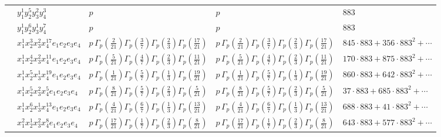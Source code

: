 \documentclass[11pt]{article}
\begin{document}
\begin{table}[ht]
{\begin{tabular}{@{}lllll@{}}
 & $y_{1}^{1} y_{2}^{5} y_{3}^{2} y_{4}^{3}$ & $p \,$ & $p \,$ & $883$ \\
 & $y_{1}^{1} y_{2}^{6} y_{3}^{1} y_{4}^{7}$ & $p \,$ & $p \,$ & $883$ \\
 & $x_{1}^{1} x_{2}^{3} x_{3}^{2} x_{4}^{17}  e_{1} e_{2} e_{3} e_{4}$ & $p \, \Gamma_p \left( \frac{2}{21} \right) \Gamma_p \left( \frac{3}{7} \right) \Gamma_p \left( \frac{2}{3} \right) \Gamma_p \left( \frac{17}{21} \right)$ & $p \, \Gamma_p \left( \frac{2}{21} \right) \Gamma_p \left( \frac{3}{7} \right) \Gamma_p \left( \frac{2}{3} \right) \Gamma_p \left( \frac{17}{21} \right)$ & $845{\cdot}883{+}356{\cdot}883^{2}{+}\cdots$ \\
 & $x_{1}^{1} x_{2}^{4} x_{3}^{2} x_{4}^{11}  e_{1} e_{2} e_{3} e_{4}$ & $p \, \Gamma_p \left( \frac{5}{21} \right) \Gamma_p \left( \frac{4}{7} \right) \Gamma_p \left( \frac{2}{3} \right) \Gamma_p \left( \frac{11}{21} \right)$ & $p \, \Gamma_p \left( \frac{5}{21} \right) \Gamma_p \left( \frac{4}{7} \right) \Gamma_p \left( \frac{2}{3} \right) \Gamma_p \left( \frac{11}{21} \right)$ & $170{\cdot}883{+}875{\cdot}883^{2}{+}\cdots$ \\
 & $x_{1}^{1} x_{2}^{5} x_{3}^{1} x_{4}^{19}  e_{1} e_{2} e_{3} e_{4}$ & $p \, \Gamma_p \left( \frac{1}{21} \right) \Gamma_p \left( \frac{5}{7} \right) \Gamma_p \left( \frac{1}{3} \right) \Gamma_p \left( \frac{19}{21} \right)$ & $p \, \Gamma_p \left( \frac{1}{21} \right) \Gamma_p \left( \frac{5}{7} \right) \Gamma_p \left( \frac{1}{3} \right) \Gamma_p \left( \frac{19}{21} \right)$ & $860{\cdot}883{+}642{\cdot}883^{2}{+}\cdots$ \\
 & $x_{1}^{1} x_{2}^{5} x_{3}^{2} x_{4}^{5}  e_{1} e_{2} e_{3} e_{4}$ & $p \, \Gamma_p \left( \frac{8}{21} \right) \Gamma_p \left( \frac{5}{7} \right) \Gamma_p \left( \frac{2}{3} \right) \Gamma_p \left( \frac{5}{21} \right)$ & $p \, \Gamma_p \left( \frac{8}{21} \right) \Gamma_p \left( \frac{5}{7} \right) \Gamma_p \left( \frac{2}{3} \right) \Gamma_p \left( \frac{5}{21} \right)$ & $37{\cdot}883{+}685{\cdot}883^{2}{+}\cdots$ \\
 & $x_{1}^{1} x_{2}^{6} x_{3}^{1} x_{4}^{13}  e_{1} e_{2} e_{3} e_{4}$ & $p \, \Gamma_p \left( \frac{4}{21} \right) \Gamma_p \left( \frac{6}{7} \right) \Gamma_p \left( \frac{1}{3} \right) \Gamma_p \left( \frac{13}{21} \right)$ & $p \, \Gamma_p \left( \frac{4}{21} \right) \Gamma_p \left( \frac{6}{7} \right) \Gamma_p \left( \frac{1}{3} \right) \Gamma_p \left( \frac{13}{21} \right)$ & $688{\cdot}883{+}41{\cdot}883^{2}{+}\cdots$ \\
 & $x_{1}^{2} x_{2}^{1} x_{3}^{2} x_{4}^{8}  e_{1} e_{2} e_{3} e_{4}$ & $p \, \Gamma_p \left( \frac{17}{21} \right) \Gamma_p \left( \frac{1}{7} \right) \Gamma_p \left( \frac{2}{3} \right) \Gamma_p \left( \frac{8}{21} \right)$ & $p \, \Gamma_p \left( \frac{17}{21} \right) \Gamma_p \left( \frac{1}{7} \right) \Gamma_p \left( \frac{2}{3} \right) \Gamma_p \left( \frac{8}{21} \right)$ & $643{\cdot}883{+}577{\cdot}883^{2}{+}\cdots$ \\

\end{tabular}}
\end{table}
\end{document}
